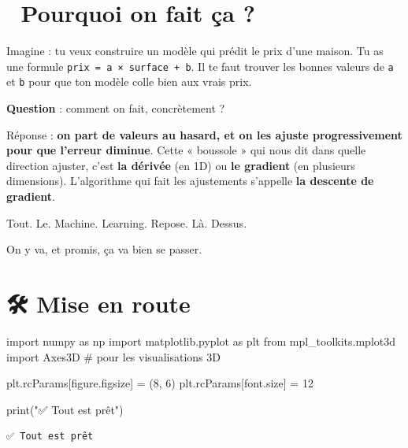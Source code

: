 \documentclass[
  french,
  11pt,
  a4paper,
]{scrbook}
\newenvironment{Shaded}{}{}
\newcommand{\BuiltInTok}[1]{\textcolor[rgb]{0.84,0.23,0.29}{#1}}
\newcommand{\CommentTok}[1]{\textcolor[rgb]{0.42,0.45,0.49}{#1}}
\newcommand{\DecValTok}[1]{\textcolor[rgb]{0.00,0.36,0.77}{#1}}
\newcommand{\ImportTok}[1]{\textcolor[rgb]{0.01,0.18,0.38}{#1}}
\newcommand{\NormalTok}[1]{\textcolor[rgb]{0.14,0.16,0.18}{#1}}
\newcommand{\OperatorTok}[1]{\textcolor[rgb]{0.14,0.16,0.18}{#1}}
\newcommand{\StringTok}[1]{\textcolor[rgb]{0.01,0.18,0.38}{#1}}
\begin{document}
\section{🎢 Pourquoi on fait ça ?}\label{pourquoi-on-fait-uxe7a-1}

Imagine : tu veux construire un modèle qui prédit le prix d'une maison.
Tu as une formule \texttt{prix\ =\ a\ ×\ surface\ +\ b}. Il te faut
trouver les bonnes valeurs de \texttt{a} et \texttt{b} pour que ton
modèle colle bien aux vrais prix.

\textbf{Question} : comment on fait, concrètement ?

Réponse : \textbf{on part de valeurs au hasard, et on les ajuste
progressivement pour que l'erreur diminue}. Cette « boussole » qui nous
dit dans quelle direction ajuster, c'est \textbf{la dérivée} (en 1D) ou
\textbf{le gradient} (en plusieurs dimensions). L'algorithme qui fait
les ajustements s'appelle \textbf{la descente de gradient}.

Tout. Le. Machine. Learning. Repose. Là. Dessus.

On y va, et promis, ça va bien se passer.

\section{🛠️ Mise en route}\label{mise-en-route-1}

\protect{}\label{setup}
\begin{Shaded}
\begin{Highlighting}[]
\ImportTok{import}\NormalTok{ numpy }\ImportTok{as}\NormalTok{ np}
\ImportTok{import}\NormalTok{ matplotlib.pyplot }\ImportTok{as}\NormalTok{ plt}
\ImportTok{from}\NormalTok{ mpl\_toolkits.mplot3d }\ImportTok{import}\NormalTok{ Axes3D  }\CommentTok{\# pour les visualisations 3D}

\NormalTok{plt.rcParams[}\StringTok{\textquotesingle{}figure.figsize\textquotesingle{}}\NormalTok{] }\OperatorTok{=}\NormalTok{ (}\DecValTok{8}\NormalTok{, }\DecValTok{6}\NormalTok{)}
\NormalTok{plt.rcParams[}\StringTok{\textquotesingle{}font.size\textquotesingle{}}\NormalTok{] }\OperatorTok{=} \DecValTok{12}

\BuiltInTok{print}\NormalTok{(}\StringTok{"✅ Tout est prêt"}\NormalTok{)}
\end{Highlighting}
\end{Shaded}

\begin{verbatim}
✅ Tout est prêt
\end{verbatim}
\end{document}
